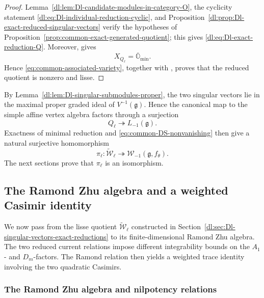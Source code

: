 \documentclass[11pt,reqno]{amsart}
\theoremstyle{definition}
\theoremstyle{remark}
\begin{document}
\begin{proof}
Lemma~\ref{dl:lem:Dl-candidate-modules-in-category-O}, the cyclicity statement
\eqref{dl:eq:Dl-individual-reduction-cyclic}, and
Proposition~\ref{dl:prop:Dl-exact-reduced-singular-vectors} verify the
hypotheses of Proposition~\ref{prop:common-exact-generated-quotient}; this
gives \eqref{dl:eq:Dl-exact-reduction-Q}.  Moreover,
\cite[Proposition~5.2]{ArakawaMoreau2018} gives
\begin{equation*}
 X_{Q_\ell}=\overline{\mathbb O}_{\min}.
\end{equation*}
Hence \eqref{eq:common-associated-variety}, together with
\cite[Theorem~6.1(3)]{ArakawaMoreau2018}, proves that the reduced quotient is
nonzero and lisse.
\end{proof}

By Lemma~\ref{dl:lem:Dl-singular-submodules-proper}, the two singular
vectors lie in the maximal proper graded ideal of
\(V^{-1}(\mathfrak g)\).  Hence the canonical map to the simple affine
vertex algebra factors through a surjection
\begin{equation*}
  Q_\ell\twoheadrightarrow L_{-1}(\mathfrak g).
\end{equation*}
Exactness of minimal reduction and
\eqref{eq:common-DS-nonvanishing} then give a natural surjective
homomorphism
\begin{equation*}
  \pi_\ell:
  \widetilde{\mathcal W}_\ell
  \twoheadrightarrow
  \mathcal W_{-1}(\mathfrak g,f_\theta).
\end{equation*}
The next sections prove that \(\pi_\ell\) is an isomorphism.

\subsection{The Ramond Zhu algebra and a weighted Casimir identity}
\label{dl:sec:Dl-Ramond-weighted-Casimir}

We now pass from the lisse quotient
\(\widetilde{\mathcal W}_\ell\) constructed in
Section~\ref{dl:sec:Dl-singular-vectors-exact-reductions} to its
finite-dimensional Ramond Zhu algebra.  The two reduced current
relations impose different integrability bounds on the
\(A_1\)- and \(D_m\)-factors.  The Ramond relation then yields a
weighted trace identity involving the two quadratic Casimirs.

\subsubsection{The Ramond Zhu algebra and nilpotency relations}
\end{document}
